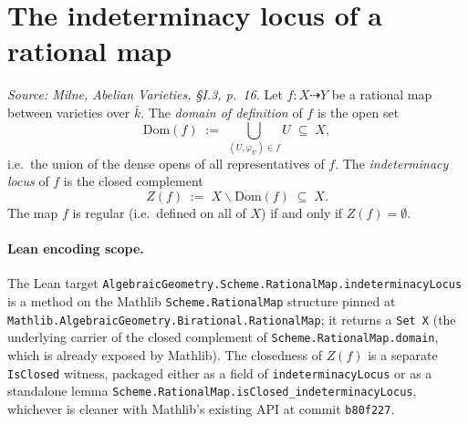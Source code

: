 \section{The indeterminacy locus of a rational map}
\label{sec:indeterm_locus}

\begin{definition}


  \label{def:indeterminacy_locus}
  \textit{Source: Milne, \emph{Abelian Varieties}, \S I.3, p.~16.}
  Let \(f \colon X \dashrightarrow Y\) be a rational map between varieties over \(\bar k\).
  The \emph{domain of definition} of \(f\) is the open set
  \[
    \mathrm{Dom}(f) \;:=\; \bigcup_{(U, \varphi_U) \in f} U \;\subseteq\; X,
  \]
  i.e.\ the union of the dense opens of all representatives of \(f\). The
  \emph{indeterminacy locus} of \(f\) is the closed complement
  \[
    Z(f) \;:=\; X \smallsetminus \mathrm{Dom}(f) \;\subseteq\; X.
  \]
  The map \(f\) is regular (i.e.\ defined on all of \(X\)) if and only if \(Z(f) = \emptyset\).

  \paragraph{Lean encoding scope.} The Lean target
  \texttt{AlgebraicGeometry.Scheme.RationalMap.indeterminacyLocus} is a method on the
  Mathlib \texttt{Scheme.RationalMap} structure pinned at
  \texttt{Mathlib.AlgebraicGeometry.Birational.RationalMap}; it returns a
  \texttt{Set X} (the underlying carrier of the closed complement of
  \texttt{Scheme.RationalMap.domain}, which is already exposed by Mathlib). The
  closedness of \(Z(f)\) is a separate \texttt{IsClosed} witness, packaged either as a
  field of \texttt{indeterminacyLocus} or as a standalone lemma
  \texttt{Scheme.RationalMap.isClosed\_indeterminacyLocus}, whichever is cleaner with
  Mathlib's existing API at commit \texttt{b80f227}.
\end{definition}

